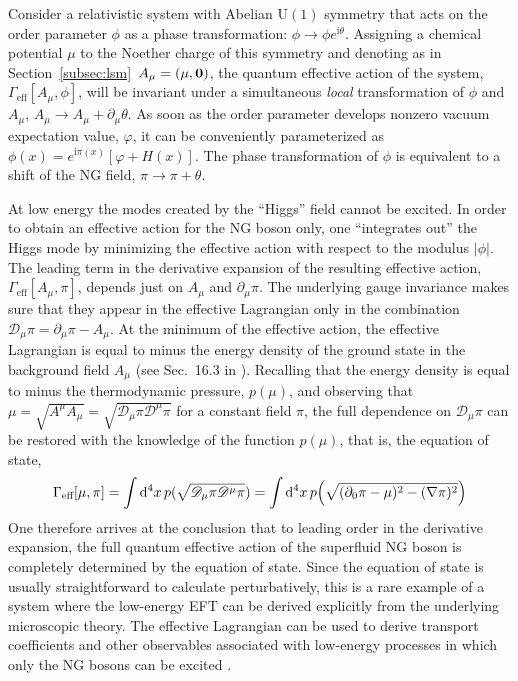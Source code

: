 \documentclass[final,3p,times,12pt,a4paper,sort&compress]{elsarticle}
\newcommand\gr[1]{\mathrm{#1}}              %
\newcommand\DD{\mathscr{D}}                 %
\newcommand\vek[1]{{\boldsymbol{\bf #1}}}   %
\newcommand\imag{\mathrm i}                 %
\newcommand\de{\partial}
\newcommand\vp{\varphi}
\newcommand\vt{\theta}
\newcommand\abs[1]{\left|#1\right|}         %
\newcommand\dfour{\mathop{{\rm d}^4\!}\nolimits} %
\begin{document}
Consider a relativistic system with Abelian $\gr{U(1)}$ symmetry that acts on
the order parameter $\phi$ as a phase transformation: $\phi\to\phi
e^{\imag\vt}$. Assigning a chemical potential $\mu$ to the Noether charge of
this symmetry and denoting as in Section~\ref{subsec:lsm}\ $A_\mu=(\mu,\vek0)$,
the quantum effective action of the system, $\Gamma_{\text{eff}}[A_\mu,\phi]$,
will be invariant under a simultaneous \emph{local} transformation of $\phi$ and
$A_\mu$, $A_\mu\to A_\mu+\de_\mu\vt$. As soon as the order parameter develops
nonzero vacuum expectation value, $\vp$, it can be conveniently parameterized
as $\phi(x)=e^{\imag\pi(x)}[\vp+H(x)]$. The phase transformation of $\phi$ is
equivalent to a shift of the NG field, $\pi\to\pi+\vt$.

At low energy the modes created by the ``Higgs'' field cannot be excited. In
order to obtain an effective action for the NG boson only, one ``integrates
out'' the Higgs mode by minimizing the effective action with respect to the
modulus $\abs\phi$. The leading term in the derivative expansion of the
resulting effective action, $\Gamma_{\text{eff}}[A_\mu,\pi]$, depends just on
$A_\mu$ and $\de_\mu\pi$. The underlying gauge invariance makes sure that they
appear in the effective Lagrangian only in the combination
$\DD_\mu\pi=\de_\mu\pi-A_\mu$. At the minimum of the effective action, the
effective Lagrangian is equal to minus the energy density of the ground state
in the background field $A_\mu$ (see Sec.~16.3 in \cite{Weinberg:1996v2}).
Recalling that the energy density is equal to minus the thermodynamic pressure,
$p(\mu)$, and observing that $\mu=\sqrt{A^\mu
A_\mu}=\sqrt{\DD_\mu\pi\DD^\mu\pi}$ for a constant field $\pi$, the full
dependence on $\DD_\mu\pi$ can be restored with the knowledge of the function
$p(\mu)$, that is, the equation of state,
\begin{equation}
\Gamma_{\text{eff}}[\mu,\pi]=
\int\dfour x\,p(\sqrt{\DD_\mu\pi\DD^\mu\pi})=
\int\dfour x\,p\Bigl(\sqrt{(\de_0\pi-\mu)^2-(\nabla\pi)^2}\Bigr)
\end{equation}
One therefore arrives at the conclusion that to leading order in the derivative
expansion, the full quantum effective action of the superfluid NG boson is
completely determined by the equation of state. Since the equation of state is
usually straightforward to calculate perturbatively, this is a rare example of
a system where the low-energy EFT can be derived explicitly from the underlying
microscopic theory. The effective Lagrangian can be used to derive transport
coefficients and other observables associated with low-energy processes in
which only the NG bosons can be excited \cite{Manuel:2004iv}.
\end{document}
